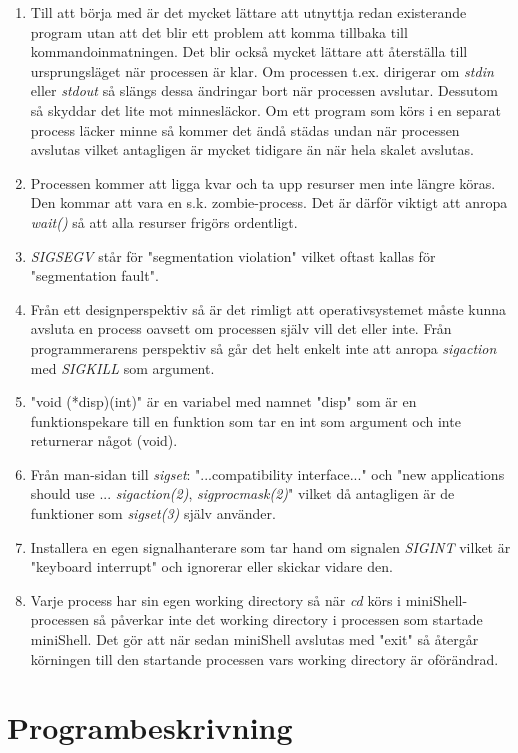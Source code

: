 \documentclass[10pt,a4paper]{article}
\begin{document}
\begin{enumerate}
\item Till att börja med är det mycket lättare att utnyttja redan existerande program utan att det blir ett problem att komma tillbaka till kommandoinmatningen. Det blir också mycket lättare att återställa till ursprungsläget när processen är klar. Om processen t.ex. dirigerar om \emph{stdin} eller \emph{stdout} så slängs dessa ändringar bort när processen avslutar. Dessutom så skyddar det lite mot minnesläckor. Om ett program som körs i en separat process läcker minne så kommer det ändå städas undan när processen avslutas vilket antagligen är mycket tidigare än när hela skalet avslutas.
\item Processen kommer att ligga kvar och ta upp resurser men inte längre köras. Den kommar att vara en s.k. zombie-process. Det är därför viktigt att anropa \emph{wait()} så att alla resurser frigörs ordentligt.
\item \emph{SIGSEGV} står för "segmentation violation" vilket oftast kallas för "segmentation fault".
\item Från ett designperspektiv så är det rimligt att operativsystemet måste kunna avsluta en process oavsett om processen själv vill det eller inte. Från programmerarens perspektiv så går det helt enkelt inte att anropa \emph{sigaction} med \emph{SIGKILL} som argument.
\item "void (*disp)(int)" är en variabel med namnet "disp" som är en funktionspekare till en funktion som tar en int som argument och inte returnerar något (void).
\item Från man-sidan till \emph{sigset}: "...compatibility interface..." och "new applications should use ... \emph{sigaction(2)}, \emph{sigprocmask(2)}" vilket då antagligen är de funktioner som \emph{sigset(3)} själv använder.
\item Installera en egen signalhanterare som tar hand om signalen \emph{SIGINT} vilket är "keyboard interrupt" och ignorerar eller skickar vidare den.
\item Varje process har sin egen working directory så när \emph{cd} körs i miniShell-processen så påverkar inte det working directory i processen som startade miniShell. Det gör att när sedan miniShell avslutas med "exit" så återgår körningen till den startande processen vars working directory är oförändrad.
\end{enumerate}

\section{Programbeskrivning}
\end{document}
